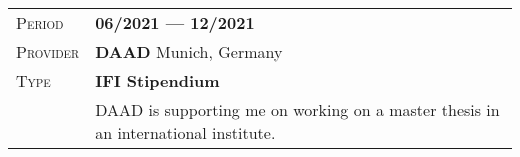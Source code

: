 \documentclass[a4paper, oneside, final]{scrartcl} %
\newcommand{\gray}{\rowcolor[gray]{.97}} %
\begin{document}
\begin{center}
\vspace{5pt}

\begin{tabularx}{0.97\linewidth}{>{\raggedleft\scshape}p{2cm}X}
\gray Period & \textbf{06/2021 --- 12/2021}\\
\gray Provider & \textbf{DAAD} \hfill Munich, Germany\\
\gray Type & \textbf{IFI Stipendium}\\
       & DAAD is supporting me on working on a master thesis in an international institute.
\end{tabularx}


\end{center}
\end{document}
